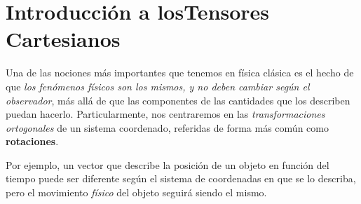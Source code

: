 \chapter[Introducción a los Tensores Cartesianos]{Introducción a los\breaktitle Tensores Cartesianos}


Una de las nociones más importantes que tenemos en física clásica es el hecho de que \emph{los fenómenos físicos son los mismos, y no deben cambiar según el observador}, más allá de que las componentes de las cantidades que los describen puedan hacerlo. Particularmente, nos centraremos en las \emph{transformaciones ortogonales} de un sistema coordenado, referidas de forma más común como \textbf{rotaciones}. 

Por ejemplo, un vector que describe la posición de un objeto en función del tiempo puede ser diferente según el sistema de coordenadas en que se lo describa, pero el movimiento \emph{físico} del objeto seguirá siendo el mismo.







